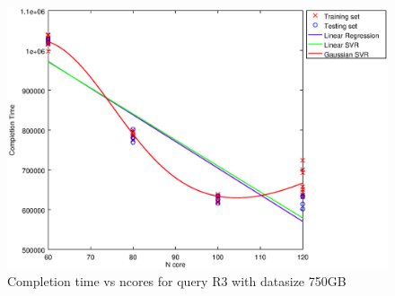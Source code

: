 
\begin {figure}[hbtp]
\centering
\includegraphics[width=\textwidth]{output/R3_750_ONLY_1_LINEAR_NCORE/plot_R3_750_bestmodels.eps}
\caption{Completion time vs ncores for query R3 with datasize 750GB}
\label{fig:only_1_linear_R3_750}
\end {figure}
